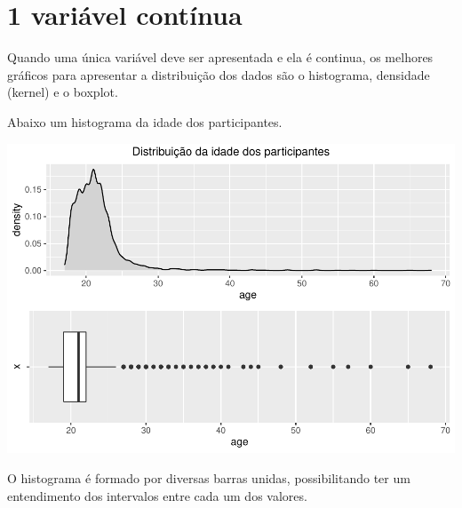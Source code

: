 \documentclass[
]{book}
\newenvironment{Shaded}{\begin{snugshade}}{\end{snugshade}}
\newcommand{\DataTypeTok}[1]{\textcolor[rgb]{0.13,0.29,0.53}{#1}}
\newcommand{\DecValTok}[1]{\textcolor[rgb]{0.00,0.00,0.81}{#1}}
\newcommand{\KeywordTok}[1]{\textcolor[rgb]{0.13,0.29,0.53}{\textbf{#1}}}
\newcommand{\NormalTok}[1]{#1}
\newcommand{\OperatorTok}[1]{\textcolor[rgb]{0.81,0.36,0.00}{\textbf{#1}}}
\newcommand{\StringTok}[1]{\textcolor[rgb]{0.31,0.60,0.02}{#1}}
\begin{document}
\hypertarget{variuxe1vel-contuxednua}{%
\section{1 variável contínua}\label{variuxe1vel-contuxednua}}

Quando uma única variável deve ser apresentada e ela é continua, os melhores gráficos para apresentar a distribuição dos dados são o histograma, densidade (kernel) e o boxplot.

Abaixo um histograma da idade dos participantes.

\begin{Shaded}
\end{Shaded}

\begin{center}\includegraphics{gitbook-demo_files/figure-latex/unnamed-chunk-19-1} \end{center}

O histograma é formado por diversas barras unidas, possibilitando ter um entendimento dos intervalos entre cada um dos valores.
\end{document}
